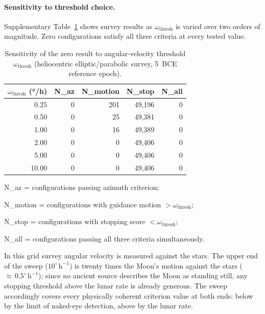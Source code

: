 \documentclass[11pt,a4paper]{article}
\begin{document}
\paragraph{Sensitivity to threshold choice.}
Supplementary Table~\ref{tab:sensitivity} shows survey results as $\omega_\mathrm{thresh}$
is varied over two orders of magnitude. Zero configurations satisfy all
three criteria at every tested value.

\begin{table}[h]
  \centering
  \begin{threeparttable}
  \caption{Sensitivity of the zero result to angular-velocity threshold
  $\omega_\mathrm{thresh}$ (heliocentric elliptic/parabolic survey, 5~BCE
  reference epoch).}
  \label{tab:sensitivity}
  
  \begin{tabular}{@{}rrrrr@{}}
    \toprule
    $\omega_\mathrm{thresh}$ (°/h) & N\_az & N\_motion & N\_stop & N\_all \\
    \midrule
    0.25 &  0 &   201 & 49,196 & 0 \\
    0.50 &  0 &    25 & 49,381 & 0 \\
    1.00 &  0 &    16 & 49,389 & 0 \\
    2.00 &  0 &     0 & 49,406 & 0 \\
    5.00 &  0 &     0 & 49,406 & 0 \\
   10.00 &  0 &     0 & 49,406 & 0 \\
    \bottomrule
  \end{tabular}
  \begin{tablenotes}
    \footnotesize
    \item N\_az = configurations passing azimuth criterion;
    \item N\_motion = configurations with guidance motion $> \omega_\mathrm{thresh}$;
    \item N\_stop = configurations with stopping score $< \omega_\mathrm{thresh}$;
    \item N\_all = configurations passing all three criteria simultaneously.
    \item In this grid survey angular velocity is measured against the stars. The upper end of the sweep ($10^\circ\,\mathrm{h}^{-1}$) is twenty times the Moon's motion against the stars (${\approx}\,0.5^\circ\,\mathrm{h}^{-1}$); since no ancient source describes the Moon as standing still, any stopping threshold above the lunar rate is already generous. The sweep accordingly covers every physically coherent criterion value at both ends: below by the limit of naked-eye detection, above by the lunar rate.
  \end{tablenotes}
  \end{threeparttable}
\end{table}
\end{document}
